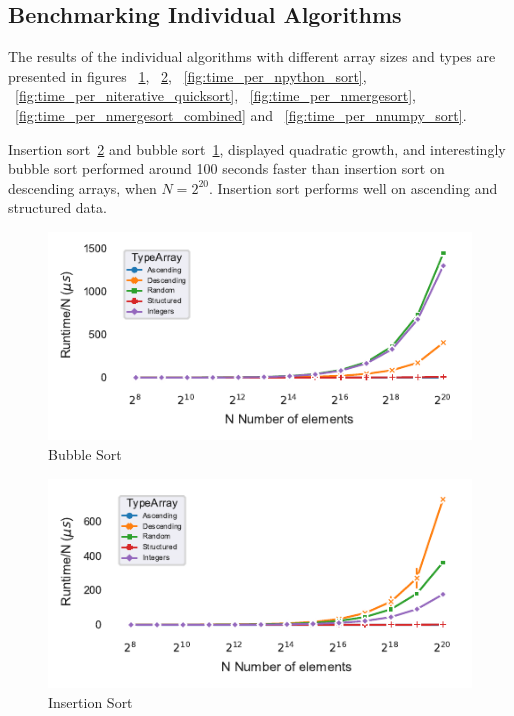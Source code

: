 \documentclass[sigconf, nonacm, natbib, screen, balance=False]{acmart}
\begin{document}
\subsection{Benchmarking Individual Algorithms}\label{sec:results_ind}
The results of the individual algorithms with different array sizes and types are presented in figures ~\ref{fig:time_per_nbubble_sort}, ~\ref{fig:time_per_ninsertion_sort},
~\ref{fig:time_per_npython_sort}, ~\ref{fig:time_per_niterative_quicksort},  ~\ref{fig:time_per_nmergesort}, ~\ref{fig:time_per_nmergesort_combined} and ~\ref{fig:time_per_nnumpy_sort}. 

Insertion sort~\ref{fig:time_per_ninsertion_sort} and bubble sort~\ref{fig:time_per_nbubble_sort}, displayed quadratic growth, and interestingly bubble sort performed around 100 seconds faster than insertion sort on descending arrays, when $N=2^{20}$. Insertion sort performs well on ascending and structured data.


\begin{figure}[]
  \centering
  \includegraphics[scale=0.75]{time_per_nbubble_sort.pdf}
  \caption{Bubble Sort}
  \label{fig:time_per_nbubble_sort}
\end{figure}

\begin{figure}[]
  \centering
  \includegraphics[scale=0.75]{time_per_ninsertion_sort.pdf}
  \caption{Insertion Sort}
  \label{fig:time_per_ninsertion_sort}
\end{figure}
\end{document}
